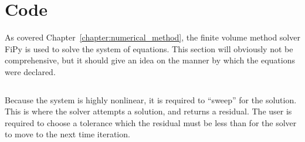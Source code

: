 \chapter{Code}\label{chapter:Code}
As covered Chapter~\ref{chapter:numerical_method}, the finite volume method solver FiPy \cite{guyer_fipy:_2009} is used to solve the system of equations.
This section will obviously not be comprehensive, but it should give an idea on the manner by which the equations were declared.
\inputminted[firstline=21, lastline=39, tabsize=4, breaklines=true, fontsize=\footnotesize, frame=single, linenos=true]{python}{../FiPy_Model/solving_flux.py}

Because the system is highly nonlinear, it is required to ``sweep'' for the solution.
This is where the solver attempts a solution, and returns a residual.
The user is required to choose a tolerance which the residual must be less than for the solver to move to the next time iteration.
\inputminted[firstline=92, lastline=107, tabsize=4, breaklines=true, fontsize=\footnotesize, frame=single, linenos=true]{python}{../FiPy_Model/solving_flux.py}

